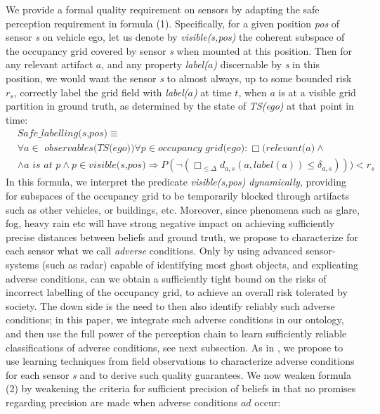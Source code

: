 We provide a formal quality requirement on sensors by adapting the safe perception requirement in formula (1). Specifically, for a given position \textit{pos}  of sensor  \textit{s}  on vehicle ego, let us denote by \textit{visible(s,pos)} the coherent subspace of the occupancy grid covered by sensor \textit{s} when mounted at this position. Then for any relevant artifact  $a$, and any property  \textit{label($a$)} discernable by  \textit{s}  in this position, we would want the sensor \textit{s} to almost always, up to some bounded risk $r_s$, correctly label the grid field with \textit{label($a$)} at time $t$, when $a$ is at a visible grid partition in ground truth, as determined by the state of \textit{TS(ego)} at that point in time:
\begin{align}\label{eq:safelabelling(s,pos)}
    &\textit{Safe}\_\textit{labelling(s,pos)} \equiv 					\\		
 & \forall a\in\textit{ observables(TS(ego))}\forall p \in \textit{occupancy grid(ego)}: \Box(\textit{relevant(a)} \land \nonumber\\  
& \land a \textit{ is at } p\land p\in \textit{visible(s,pos)} \Rightarrow P(\neg( \Box_{\leq\Delta} d_{a,s}(a,\textit{label}(a))\leq\delta_{a,s}))) < r_s\nonumber
\end{align}
In this formula, we interpret the predicate \textit{visible(s,pos)} \emph{dynamically}, providing for subspaces of the occupancy grid to be temporarily blocked through artifacts such as other vehicles, or buildings, etc. Moreover, since phenomena such as glare, fog, heavy rain etc will have strong negative impact on achieving sufficiently precise distances between beliefs and ground truth, we propose to characterize for each sensor what we call \emph{adverse} conditions. Only by using advanced sensor-systems (such as radar)  capable of identifying most ghost objects, and explicating adverse conditions, can we obtain a sufficiently tight bound on the risks of incorrect labelling of the occupancy grid, to achieve an overall risk tolerated by society. The down side is the need to then also identify reliably such adverse conditions; in this paper, we integrate such adverse conditions in our ontology, and then use the full power of the perception chain to learn sufficiently reliable classifications of adverse conditions, see next subsection. As in \cite{galbas}, we propose to use learning techniques from field observations to characterize adverse conditions for each sensor \textit{s} and to derive such quality guarantees. We now weaken formula (2) by weakening the criteria for sufficient precision of beliefs in that no promises regarding precision are made when adverse conditions $ad$ occur:

